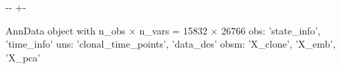 \documentclass[letterpaper,10pt,english]{sphinxmanual}
\newlength\nbsphinxcodecellspacing
\begin{document}
{
\begin{sphinxVerbatim}[commandchars=\\\{\}]
\llap{\color{nbsphinxin}[4]:\,\hspace{\fboxrule}\hspace{\fboxsep}}
\end{sphinxVerbatim}
}

{

\kern-\sphinxverbatimsmallskipamount\kern-\baselineskip
\kern+\FrameHeightAdjust\kern-\fboxrule
\vspace{\nbsphinxcodecellspacing}

\begin{sphinxVerbatim}[commandchars=\\\{\}]
\llap{\color{nbsphinxout}[4]:\,\hspace{\fboxrule}\hspace{\fboxsep}}AnnData object with n\_obs × n\_vars = 15832 × 26766
    obs: 'state\_info', 'time\_info'
    uns: 'clonal\_time\_points', 'data\_des'
    obsm: 'X\_clone', 'X\_emb', 'X\_pca'
\end{sphinxVerbatim}
}
\end{document}
